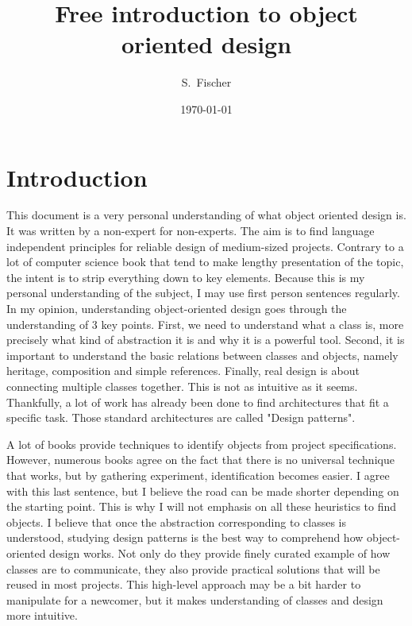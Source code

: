 \documentclass[12pt]{article}
\begin{document}
\title{Free introduction to object oriented design}%
\author{S.~Fischer}%
\date{\today}%

\newpage

\tableofcontents

\newpage

\section{Introduction}

This document is a very personal understanding of what object oriented design is. It was written by a non-expert for non-experts. The aim is to find language independent principles for reliable design of medium-sized projects. Contrary to a lot of computer science book that tend to make lengthy presentation of the topic, the intent is to strip everything down to key elements. Because this is my personal understanding of the subject, I may use first person sentences regularly. In my opinion, understanding object-oriented design goes through the understanding of 3 key points. First, we need to understand what a class is, more precisely what kind of abstraction it is and why it is a powerful tool. Second, it is important to understand the basic relations between classes and objects, namely heritage, composition and simple references. Finally, real design is about connecting multiple classes together. This is not as intuitive as it seems. Thankfully, a lot of work has already been done to find architectures that fit a specific task. Those standard architectures are called "Design patterns".

A lot of books provide techniques to identify objects from project specifications. However, numerous books agree on the fact that there is no universal technique that works, but by gathering experiment, identification becomes easier. I agree with this last sentence, but I believe the road can be made shorter depending on the starting point. This is why I will not emphasis on all these heuristics to find objects. I believe that once the abstraction corresponding to classes is understood, studying design patterns is the best way to comprehend how object-oriented design works. Not only do they provide finely curated example of how classes are to communicate, they also provide practical solutions that will be reused in most projects. This high-level approach may be a bit harder to manipulate for a newcomer, but it makes understanding of classes and design more intuitive.
\end{document}
